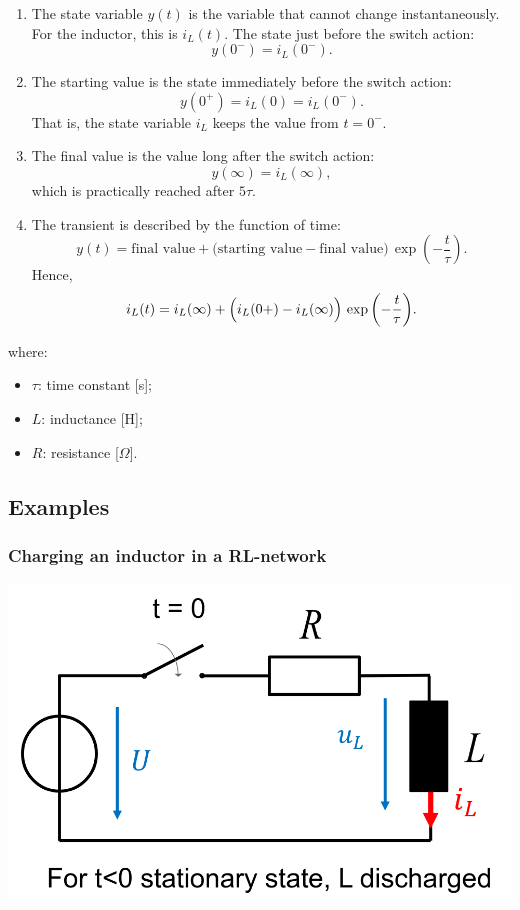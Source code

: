\documentclass{article}
\begin{document}
\begin{enumerate}
    \item The state variable $ y(t) $ is the variable that cannot change instantaneously.
    For the inductor, this is $ i_L(t) $. The state just before the switch action:
    \[
      y(0^-) = i_L(0^-).
    \]
  
    \item The starting value is the state immediately before the switch action:
    \[
      y(0^+) = i_L(0) = i_L(0^-).
    \]
    That is, the state variable $ i_L $ keeps the value from $ t = 0^- $.
  
    \item The final value is the value long after the switch action:
    \[
      y(\infty) = i_L(\infty),
    \]
    which is practically reached after $ 5\tau $.
  
    \item The transient is described by the function of time:
    \[
      y(t) = \text{final value}
      + \bigl(\text{starting value} - \text{final value}\bigr)\, \exp{\left(-\frac{t}{\tau}\right)}.
    \]
    Hence,
    \[
      i_L(t) = i_L(\infty)
      + \Bigl(i_L(0+) - i_L(\infty)\Bigr)\, \exp{\left(-\frac{t}{\tau}\right)}.
    \]
\end{enumerate}

\newpage
{}

where:
\begin{itemize}
    \item $\tau$: time constant [s];
    \item $L$: inductance [H];
    \item $R$: resistance [$\Omega$].
\end{itemize}

\subsection{Examples}
\subsubsection{Charging an inductor in a RL-network}
\begin{center}
    \includegraphics[width=.5\textwidth]{media/inductor_ex1.png}
\end{center}
\end{document}
